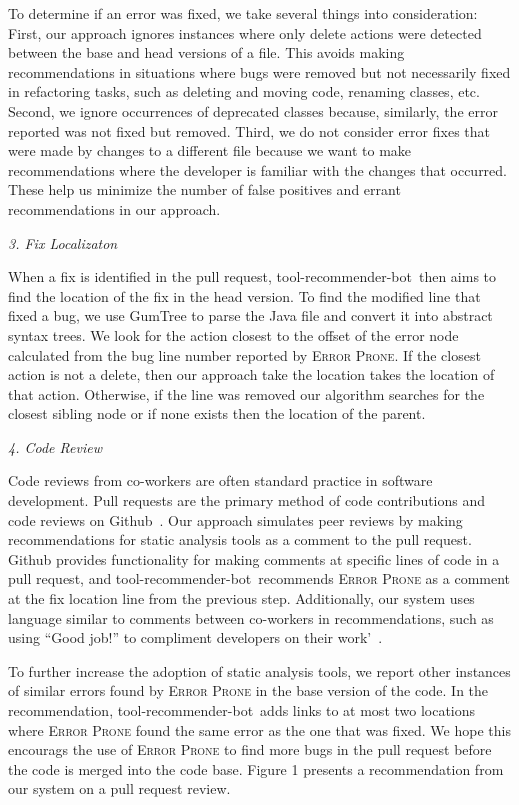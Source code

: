 \documentclass[conference]{IEEEtran}
\newcommand{\tool}{tool-recommender-bot}
\newcommand{\pseudosubsection}[1]{\vspace{2mm} {\it #1}}
\begin{document}
To determine if an error was fixed, we take several things into consideration: First, our approach ignores instances where only delete actions were detected between the base and head versions of a file. This avoids making recommendations in situations where bugs were removed but not necessarily fixed in refactoring tasks, such as deleting and moving code, renaming classes, etc. Second, we ignore occurrences of deprecated classes because, similarly, the error reported was not fixed but removed. Third, we do not consider error fixes that were made by changes to a different file because we want to make recommendations where the developer is familiar with the changes that occurred. These help us minimize the number of false positives and errant recommendations in our approach.

\pseudosubsection{3. Fix Localizaton}

When a fix is identified in the pull request, \tool~then aims to find the location of the fix in the head version. To find the modified line that fixed a bug, we use GumTree to parse the Java file and convert it into abstract syntax trees. We look for the action closest to the offset of the error node calculated from the bug line number reported by \textsc{Error Prone}. If the closest action is not a delete, then our approach take the location takes the location of that action. Otherwise, if the line was removed our algorithm searches for the closest sibling node or if none exists then the location of the parent.

\pseudosubsection{4. Code Review}

Code reviews from co-workers are often standard practice in software development. Pull requests are the primary method of code contributions and code reviews on Github~\cite{PullRequestReview}. Our approach simulates peer reviews by making recommendations for static analysis tools as a comment to the pull request. Github provides functionality for making comments at specific lines of code in a pull request, and \tool~recommends \textsc{Error Prone} as a comment at the fix location line from the previous step. Additionally, our system  uses language similar to comments between co-workers in recommendations, such as using ``Good job!'' to compliment developers on their work'~\cite{?}.

To further increase the adoption of static analysis tools, we report other instances of similar errors found by \textsc{Error Prone} in the base version of the code. In the recommendation, \tool~adds links to at most two locations where \textsc{Error Prone} found the same error as the one that was fixed. We hope this encourags the use of \textsc{Error Prone} to find more bugs in the pull request before the code is merged into the code base. Figure 1 presents a recommendation from our system on a pull request review.
\end{document}

